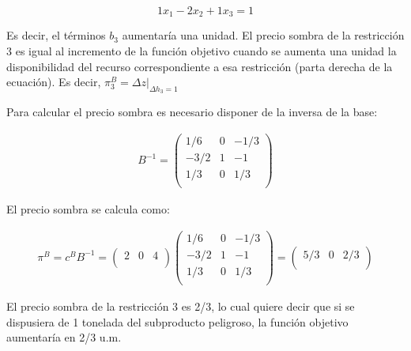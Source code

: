 \begin{enumerate}
    $$1x_1 - 2x_2 + 1x_3 = 1$$

    Es decir, el términos $b_3$ aumentaría una unidad. El precio sombra de la restricción 3 es igual al incremento de la función objetivo cuando se aumenta una unidad la disponibilidad del recurso correspondiente a esa restricción (parta derecha de la ecuación). Es decir, $\pi^B_3 = \Delta z|_{\Delta h_3 = 1}$

    Para calcular el precio sombra es necesario disponer de la inversa de la base:

    \begin{equation}
    \begin{split}
    B^{-1} =\begin{pmatrix}
    1/6 & 0 & -1/3\\
    -3/2 & 1 & -1\\
    1/3 & 0 & 1/3\\
    \end{pmatrix}
    \end{split}
    \end{equation}
    
    El precio sombra se calcula como:

    \begin{equation}
    \begin{split}
    \pi^B = c^BB^{-1} = \begin{pmatrix}
    2 & 0 & 4\\
    \end{pmatrix}
    \begin{pmatrix}
    1/6 & 0 & -1/3\\
    -3/2 & 1 & -1\\
    1/3 & 0 & 1/3\\
    \end{pmatrix}
     = \begin{pmatrix}
    5/3 & 0 & 2/3\\
    \end{pmatrix}
    \end{split}
    \end{equation}
    
    El precio sombra de la restricción 3 es 2/3, lo cual quiere decir que si se dispusiera de 1 tonelada del subproducto peligroso, la función objetivo aumentaría en 2/3 u.m.
    
\end{enumerate}






